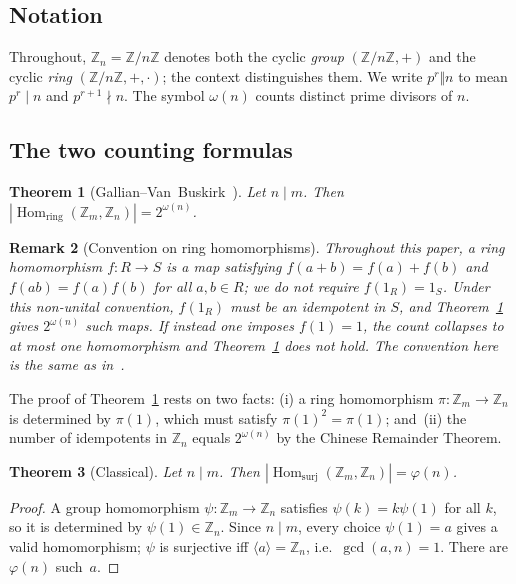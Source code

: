 \documentclass[12pt]{amsart}
\theoremstyle{bluehead}
\newtheorem{theorem}{Theorem}[section]
\theoremstyle{orangehead}
\theoremstyle{greenhead}
\newtheorem{remark}[theorem]{Remark}
\newcommand{\Z}{\mathbb{Z}}
\newcommand{\Hring}{\operatorname{Hom}_{\mathrm{ring}}}
\newcommand{\Hsurj}{\operatorname{Hom}_{\mathrm{surj}}}
\renewcommand{\phi}{\varphi}
\begin{document}
\subsection*{Notation}

Throughout, $\Z_n=\Z/n\Z$ denotes both the cyclic \emph{group}
$(\Z/n\Z,+)$ and the cyclic \emph{ring} $(\Z/n\Z,+,\cdot)$; the
context distinguishes them.  We write $p^r\Vert n$ to mean $p^r\mid n$
and $p^{r+1}\nmid n$.  The symbol $\omega(n)$ counts distinct prime
divisors of $n$.

\subsection*{The two counting formulas}

\begin{theorem}[Gallian--Van~Buskirk~\cite{gallian84}]\label{thm:GVB}
  Let $n\mid m$.  Then $|\Hring(\Z_m,\Z_n)|=2^{\omega(n)}$.
\end{theorem}

\begin{remark}[Convention on ring homomorphisms]\label{rem:nonunital}
  Throughout this paper, a \emph{ring homomorphism} $f\colon R\to S$
  is a map satisfying $f(a+b)=f(a)+f(b)$ and $f(ab)=f(a)f(b)$
  for all $a,b\in R$; we do \emph{not} require $f(1_R)=1_S$.
  Under this non-unital convention, $f(1_R)$ must be an idempotent
  in $S$, and Theorem~\ref{thm:GVB} gives $2^{\omega(n)}$ such maps.
  If instead one imposes $f(1)=1$, the count collapses to at most
  one homomorphism and Theorem~\ref{thm:GVB} does not hold.
  The convention here is the same as in~\cite{gallian84}.
\end{remark}

The proof of Theorem~\ref{thm:GVB} rests on two facts: (i) a ring homomorphism $\pi\colon\Z_m\to\Z_n$
is determined by $\pi(1)$, which must satisfy $\pi(1)^2=\pi(1)$;
and~(ii) the number of idempotents in $\Z_n$ equals $2^{\omega(n)}$ by
the Chinese Remainder Theorem.

\begin{theorem}[Classical]\label{thm:surj-classical}
  Let $n\mid m$.  Then $|\Hsurj(\Z_m,\Z_n)|=\phi(n)$.
\end{theorem}

\begin{proof}
  A group homomorphism $\psi\colon\Z_m\to\Z_n$ satisfies $\psi(k)=k\psi(1)$
  for all $k$, so it is determined by $\psi(1)\in\Z_n$.  Since $n\mid m$,
  every choice $\psi(1)=a$ gives a valid homomorphism; $\psi$ is surjective
  iff $\langle a\rangle=\Z_n$, i.e.\ $\gcd(a,n)=1$.  There are $\phi(n)$
  such~$a$.
\qedhere
\end{proof}
\end{document}
